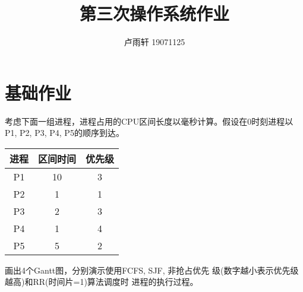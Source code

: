 \documentclass{ctexart}
\title{第三次操作系统作业}
\author{卢雨轩 19071125}
\begin{document}
\maketitle

\section*{基础作业}
\begin{outline}[enumerate]
    \1 考虑下面一组进程，进程占用的CPU区间长度以毫秒计算。假设在0时刻进程以P1, P2, P3, P4, P5的顺序到达。
\begin{center}
    \begin{tabular}{ccc}
        \toprule
        进程 & 区间时间 & 优先级 \\
        \midrule
        P1 & 10 & 3 \\
        P2 & 1 & 1 \\
        P3 & 2 & 3 \\
        P4 & 1 & 4 \\
        P5 & 5 & 2 \\
        \bottomrule
    \end{tabular}
\end{center}

    \2 画出4个Gantt图，分别演示使用FCFS, SJF, 非抢占优先 级(数字越小表示优先级越高)和RR(时间片=1)算法调度时 进程的执行过程。


\end{outline}
\end{document}
